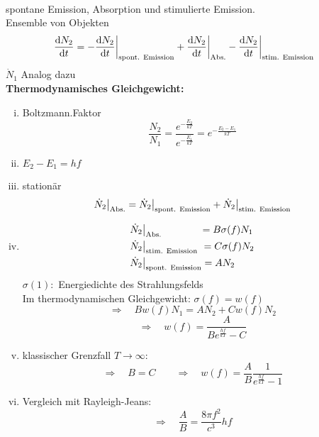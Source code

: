 \\
spontane Emission, Absorption und stimulierte Emission.\\[5pt]
Ensemble von Objekten
\begin{equation*}
\frac{\textrm{d} N_2}{\textrm{d} t} = - \frac{\textrm{d} N_2}{\textrm{d} t} \bigg|_{\textrm{spont. Emission}} + \frac{\textrm{d} N_2}{\textrm{d} t} \bigg|_{\textrm{Abs.}} - \frac{\textrm{d} N_2}{\textrm{d} t} \bigg|_{\textrm{stim. Emission}}
\end{equation*}
$ \dot{N}_1 $ Analog dazu\\[5pt]
\textbf{Thermodynamisches Gleichgewicht:}
\begin{enumerate}[i)]
	\item Boltzmann.Faktor
	\begin{equation*}
	\frac{N_2}{N_1} = \frac{e^{-\frac{E_2}{kT}}}{e^{-\frac{E_1}{kT}}} = e^{-\frac{E_2 - E_1}{kT}}
	\end{equation*}
	\item $ E_2 - E_1 = h f $
	\item stationär
	\begin{equation*}
	\dot{N}_2 \big|_{\textrm{Abs.}} = \dot{N}_2 \big|_{\textrm{spont. Emission}} + \dot{N}_2 \big|_{\textrm{stim. Emission}}
	\end{equation*}
	\item 
	
	
	\noindent
	\begin{align*}
	\dot{N}_2 & \big|_{\textrm{Abs.}} \qquad \quad \ \ \, = B \sigma(f) N_1\\
	\dot{N}_2 & \big|_{\textrm{stim. Emission}} \ = C \sigma(f) N_2\\
	\dot{N}_2 & \big|_{\textrm{spont. Emission}} = A N_2
	\end{align*}
	$ \sigma(1) : $ Energiedichte des Strahlungsfelds\\[5pt]
	Im thermodynamischen Gleichgewicht: $ \sigma(f) = w(f) $
	\begin{equation*}
	\Rightarrow \quad B w(f) N_1 = A N_2 + C w(f) N_2
	\end{equation*}
	\begin{equation*}
	\Rightarrow \quad w(f) = \frac{A}{B e^{\frac{hf}{kT}} - C}
	\end{equation*}
	\item klassischer Grenzfall $ T \to \infty $:
	\begin{equation*}
	\Rightarrow \quad B = C \qquad \Rightarrow \quad w(f) = \frac{A}{B} \frac{1}{e^{\frac{hf}{kT}} - 1}
	\end{equation*}
	\item Vergleich mit Rayleigh-Jeans:
	\begin{equation*}
	\Rightarrow \quad \frac{A}{B} = \frac{8 \pi f^2}{c^3} h f
	\end{equation*}
\end{enumerate}
